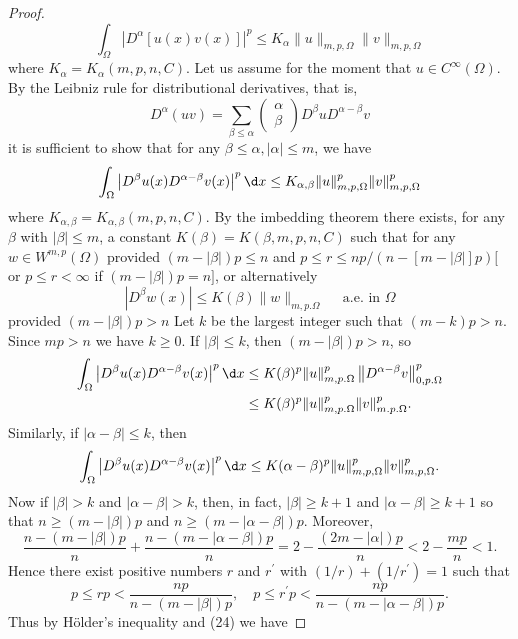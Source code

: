 \begin{proof}
  \[
  \int_{\Omega}\left|D^\alpha[u(x) v(x)]\right|^p \leq K_\alpha\|u\|_{m, p, \Omega}\|v\|_{m, p, \Omega}
  \]
  where $K_\alpha=K_\alpha(m, p, n, C)$. Let us assume for the moment that $u \in C^{\infty}(\Omega)$. By the Leibniz rule for distributional derivatives, that is,
  \[
  D^\alpha(u v)=\sum_{\beta \leq \alpha}\left(\begin{array}{l}
  \alpha \\
  \beta
  \end{array}\right) D^\beta u D^{\alpha-\beta} v
  \]
  it is sufficient to show that for any $\beta \leq \alpha,|\alpha| \leq m$, we have
  \[
  \int_{\Omega}\left|D^\beta u(x) D^{\alpha-\beta} v(x)\right|^p \d x \leq K_{\alpha, \beta}\|u\|_{m, p, \Omega}^p\|v\|_{m, p, \Omega}^p
  \]
  where $K_{\alpha, \beta}=K_{\alpha, \beta}(m, p, n, C)$. By the imbedding theorem there exists, for any $\beta$ with $|\beta| \leq m$, a constant $K(\beta)=K(\beta, m, p, n, C)$ such that for any $w \in W^{m,p}(\Omega)$
  provided $(m-|\beta|) p \leq n$ and $p \leq r \leq n p /(n-[m-|\beta|] p)[$ or $p \leq r<\infty$ if $(m-|\beta|) p=n]$, or alternatively
  \[
  \left|D^\beta w(x)\right| \leq K(\beta)\|w\|_{m, p . \Omega} \quad \text { a.e. in } \Omega
  \]
  provided $(m-|\beta|) p>n$
  Let $k$ be the largest integer such that $(m-k) p>n$. Since $m p>n$ we have $k \geq 0$. If $|\beta| \leq k$, then $(m-|\beta|) p>n$, so
  \[
  \begin{aligned}
  \int_{\Omega}\left|D^\beta u(x) D^{\alpha-\beta} v(x)\right|^p \d x & \leq K(\beta)^p\|u\|_{m, p . \Omega}^p\left\|D^{\alpha-\beta} v\right\|_{0, p . \Omega}^p \\
  & \leq K(\beta)^p\|u\|_{m, p . \Omega}^p\|v\|_{m . p . \Omega}^p .
  \end{aligned}
  \]
  Similarly, if $|\alpha-\beta| \leq k$, then
  \[
  \int_{\Omega}\left|D^\beta u(x) D^{\alpha-\beta} v(x)\right|^p \d x \leq K(\alpha-\beta)^p\|u\|_{m, p, \Omega}^p\|v\|_{m, p, \Omega}^p .
  \]
  Now if $|\beta|>k$ and $|\alpha-\beta|>k$, then, in fact, $|\beta| \geq k+1$ and $|\alpha-\beta| \geq k+1$ so that $n \geq(m-|\beta|) p$ and $n \geq(m-|\alpha-\beta|) p$. Moreover,
  \[
  \frac{n-(m-|\beta|) p}{n}+\frac{n-(m-|\alpha-\beta|) p}{n}=2-\frac{(2 m-|\alpha|) p}{n}<2-\frac{m p}{n}<1 .
  \]
  Hence there exist positive numbers $r$ and $r^{\prime}$ with $(1 / r)+\left(1 / r^{\prime}\right)=1$ such that
  \[
  p \leq r p<\frac{n p}{n-(m-|\beta|) p}, \quad p \leq r^{\prime} p<\frac{n p}{n-(m-|\alpha-\beta|) p} .
  \]
  Thus by Hölder's inequality and (24) we have

\end{proof}

